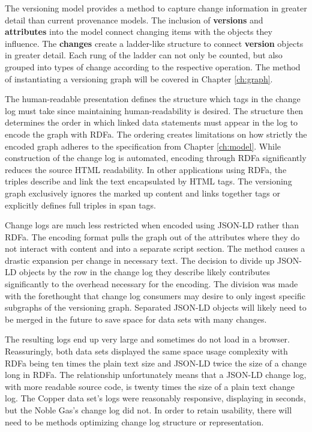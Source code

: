 The versioning model provides a method to capture change information in greater detail than current provenance models.
The inclusion of \textbf{versions} and \textbf{attributes} into the model connect changing items with the objects they influence.
The \textbf{changes} create a ladder-like structure to connect \textbf{version} objects in greater detail.
Each rung of the ladder can not only be counted, but also grouped into types of change according to the respective operation.
The method of instantiating a versioning graph will be covered in Chapter \ref{ch:graph}.

The human-readable presentation defines the structure which tags in the chan\-ge log must take since maintaining human-readability is desired.
The structure then determines the order in which linked data statements must appear in the log to encode the graph with RDFa.
The ordering creates limitations on how strictly the encoded graph adheres to the specification from Chapter \ref{ch:model}.
While construction of the change log is automated, encoding through RDFa significantly reduces the source HTML readability.
In other applications using RDFa, the triples describe and link the text encapsulated by HTML tags.
The versioning graph exclusively ignores the marked up content and links together tags or explicitly defines full triples in span tags.

Change logs are much less restricted when encoded using JSON-LD rather than RDFa.
The encoding format pulls the graph out of the attributes where they do not interact with content and into a separate script section.
The method causes a drastic expansion per change in necessary text.
The decision to divide up JSON-LD objects by the row in the change log they describe likely contributes significantly to the overhead necessary for the encoding.
The division was made with the forethought that change log consumers may desire to only ingest specific subgraphs of the versioning graph.
Separated JSON-LD objects will likely need to be merged in the future to save space for data sets with many changes.

The resulting logs end up very large and sometimes do not load in a browser.
Reassuringly, both data sets displayed the same space usage complexity with RDFa being ten times the plain text size and JSON-LD twice the size of a change long in RDFa.
The relationship unfortunately means that a JSON-LD change log, with more readable source code, is twenty times the size of a plain text change log.
The Copper data set's logs were reasonably responsive, displaying in seconds, but the Noble Gas's change log did not.
In order to retain usability, there will need to be methods optimizing change log structure or representation.